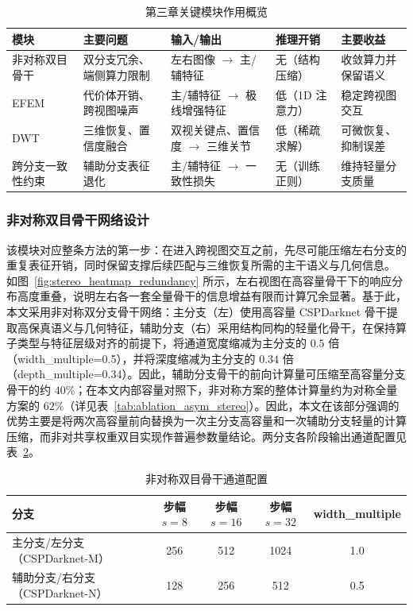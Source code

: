 \begin{table}[htbp]
  \centering
  \footnotesize
  \caption{第三章关键模块作用概览}
  \label{tab:ch3_module_overview}
  \begin{tabular}{@{}p{2.0cm}p{2.5cm}p{2.5cm}p{1.5cm}p{2.5cm}@{}}
    \toprule
    模块 & 主要问题 & 输入/输出 & 推理开销 & 主要收益 \\
    \midrule
    非对称双目骨干 & 双分支冗余、端侧算力限制 & 左右图像 $\rightarrow$ 主/辅特征 & 无（结构压缩） & 收敛算力并保留语义 \\
    EFEM & 代价体开销、跨视图噪声 & 主/辅特征 $\rightarrow$ 极线增强特征 & 低（1D 注意力） & 稳定跨视图交互 \\
    DWT & 三维恢复、置信度融合 & 双视关键点、置信度 $\rightarrow$ 三维关节 & 低（稀疏求解） & 可微恢复、抑制误差 \\
    跨分支一致性约束 & 辅助分支表征退化 & 主/辅特征 $\rightarrow$ 一致性损失 & 无（训练正则） & 维持轻量分支质量 \\
    \bottomrule
  \end{tabular}
\end{table}

\subsubsection{非对称双目骨干网络设计}
\label{subsubsec:asym_backbone}
该模块对应整条方法的第一步：在进入跨视图交互之前，先尽可能压缩左右分支的重复表征开销，同时保留支撑后续匹配与三维恢复所需的主干语义与几何信息。
如图~\ref{fig:stereo_heatmap_redundancy} 所示，左右视图在高容量骨干下的响应分布高度重叠，说明左右各一套全量骨干的信息增益有限而计算冗余显著。基于此，本文采用非对称双分支骨干网络：主分支（左）使用高容量 CSPDarknet 骨干提取高保真语义与几何特征，辅助分支（右）采用结构同构的轻量化骨干，在保持算子类型与特征层级对齐的前提下，将通道宽度缩减为主分支的 $0.5$ 倍（width\_multiple=0.5），并将深度缩减为主分支的 $0.34$ 倍（depth\_multiple=0.34）。因此，辅助分支骨干的前向计算量可压缩至高容量分支骨干的约 $40\%$；在本文内部容量对照下，非对称方案的整体计算量约为对称全量方案的 $62\%$（详见表~\ref{tab:ablation_asym_stereo}）。因此，本文在该部分强调的优势主要是将两次高容量前向替换为一次主分支高容量和一次辅助分支轻量的计算压缩，而非对共享权重双目实现作普遍参数量结论。两分支各阶段输出通道配置见表~\ref{tab:backbone_config}。

\begin{table}[htbp]
  \centering
  \small
\caption{非对称双目骨干通道配置}
  \label{tab:backbone_config}
  \begin{tabular}{lcccc}
    \toprule
    分支 & 步幅$s=8$ & 步幅$s=16$ & 步幅$s=32$ & width\_multiple \\
    \midrule
    主分支/左分支（CSPDarknet-M） & 256 & 512 & 1024 & 1.0 \\
    辅助分支/右分支（CSPDarknet-N） & 128 & 256 & 512  & 0.5 \\
    \bottomrule
  \end{tabular}
\end{table}


